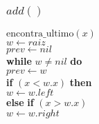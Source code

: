 \documentclass{beamer}
\begin{document}
\begin{frame}[shrink]
\frametitle{$add()$}

\begin{oframed}
\begin{flushleft}
\hspace*{1em} \ensuremath{\mathrm{encontra\_ultimo}(\ensuremath{\mathit{x}})}\\
\hspace*{1em} \hspace*{1em} \ensuremath{\ensuremath{\mathit{w}} \gets  \ensuremath{raiz}}\\
\hspace*{1em} \hspace*{1em} \ensuremath{\ensuremath{\mathit{prev}} \gets  \ensuremath{nil}}\\
\hspace*{1em} \hspace*{1em} {\color{black} \textbf{while}} \ensuremath{\ensuremath{\mathit{w}} \ne nil} {\color{black} \textbf{do}}  \\
\hspace*{1em} \hspace*{1em} \hspace*{1em} \ensuremath{\ensuremath{\mathit{prev}} \gets  \ensuremath{w}}\\
\hspace*{1em} \hspace*{1em} \hspace*{1em} {\color{black} \textbf{if}} \ensuremath{(\ensuremath{\mathit{x}} < \ensuremath{\mathit{w}}.\ensuremath{\mathit{x}})} {\color{black} \textbf{then}} \\
\hspace*{1em} \hspace*{1em} \hspace*{1em} \hspace*{1em} \ensuremath{\ensuremath{\mathit{w}} \gets  \ensuremath{\ensuremath{\mathit{w}}.left}}\\
\hspace*{1em} \hspace*{1em} \hspace*{1em} {\color{black} \textbf{else}} {\color{black} \textbf{if}} \ensuremath{(\ensuremath{\mathit{x}} > \ensuremath{\mathit{w}}.\ensuremath{\mathit{x}})}\\
\hspace*{1em} \hspace*{1em} \hspace*{1em} \hspace*{1em} \ensuremath{\ensuremath{\mathit{w}} \gets  \ensuremath{\ensuremath{\mathit{w}}.right}}\\

\end{flushleft}
\end{oframed}
\end{frame}
\end{document}
